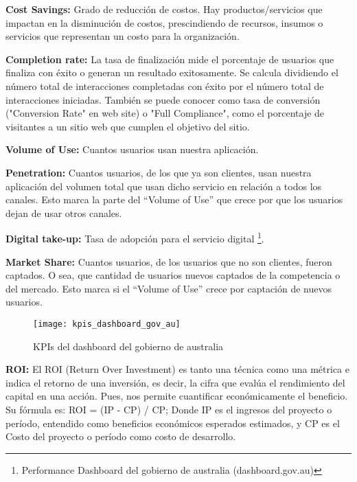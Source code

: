 \begin{description}
  \item {\textbf{Cost Savings:} Grado de reducción de costos. Hay productos/servicios que impactan en la disminución de costos, prescindiendo de recursos, insumos o servicios que representan un costo para la organización.
}

  \item {\textbf{Completion rate:} La tasa de finalización mide el porcentaje de usuarios que finaliza con éxito o generan un resultado exitosamente. Se calcula dividiendo el número total de interacciones completadas con éxito por el número total de interacciones iniciadas. También se puede conocer como tasa de conversión ("Conversion Rate" en web site) o "Full Compliance", como el porcentaje de visitantes a un sitio web que cumplen el objetivo del sitio. 
}

  \item {\textbf{Volume of Use:} Cuantos usuarios usan nuestra aplicación.
}
  \item {\textbf{Penetration:} Cuantos usuarios, de los que ya son clientes, usan nuestra aplicación del volumen total que usan dicho servicio en relación a todos los canales. Esto marca la parte del “Volume of Use” que crece por que los usuarios dejan de usar otros canales.
}

  \item {\textbf{Digital take-up:} Tasa de adopción para el servicio digital \footnote{Performance Dashboard del gobierno de australia (dashboard.gov.au)}.
}

  \item {\textbf{Market Share:} Cuantos usuarios, de los usuarios que no son clientes, fueron captados. O sea, que cantidad de usuarios nuevos captados de la competencia o del mercado. Esto marca si el “Volume of Use” crece por captación de nuevos usuarios.
}

  \begin{figure}[h]
  \centering
  \texttt{[image: kpis\_dashboard\_gov\_au]}
  \caption{KPIs del dashboard del gobierno de australia}
  \centering
  \label{fig:kpis_dashboard_gov_au} %
  \end{figure}
  \FloatBarrier

  \item {\textbf{ROI:} El ROI (Return Over Investment) es tanto una técnica como una métrica e indica el retorno de una inversión, es decir, la cifra que evalúa el rendimiento del capital en una acción. Pues, nos permite cuantificar económicamente el beneficio. Su fórmula es: ROI = (IP - CP) / CP; Donde IP es el ingresos del proyecto o período, entendido como beneficios económicos esperados estimados, y CP es el Costo del proyecto o período como costo de desarrollo.
}

\end{description}

